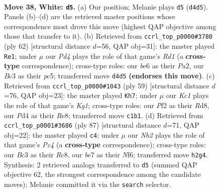 \documentclass[11pt]{article}
\begin{document}
\clearpage

\begin{figure}[p]\centering
\begin{subfigure}{0.46\textwidth}\centering
\resizebox{\linewidth}{!}{%
\newchessgame
\chessboard[
  setfen={1k5r/rp2b1p1/p1p1b2p/P4p2/R1pP3P/2B1P1P1/1P3P1N/2K4R w - - 3 38},
  showmover=false,
  pgfstyle=straightmove, color=movearrow, markmove={d4-d5}
]}
\caption{}
\end{subfigure}\hfill
\begin{subfigure}{0.46\textwidth}\centering
\resizebox{\linewidth}{!}{%
\newchessgame
\chessboard[
  setfen={5k2/2r2pb1/1r2p1p1/p1p4p/7P/1PPP2P1/P1R1BPK1/3R4 w - - 0 32},
  showmover=false,
  pgfstyle=straightmove, color=movearrow, markmove={d1-e1}
]}
\caption{}
\end{subfigure}
\\[4pt]
\begin{subfigure}{0.46\textwidth}\centering
\resizebox{\linewidth}{!}{%
\newchessgame
\chessboard[
  setfen={3rrbk1/p4p2/1p1ppP1p/7p/P1PBP3/1P6/6PP/4RRK1 b - - 1 30},
  showmover=false,
  pgfstyle=straightmove, color=movearrow, markmove={g8-h7}
]}
\caption{}
\end{subfigure}\hfill
\begin{subfigure}{0.46\textwidth}\centering
\resizebox{\linewidth}{!}{%
\newchessgame
\chessboard[
  setfen={2r3k1/5pp1/3p1n1p/pBp1p3/P3P3/1RPP3P/2r2PP1/5RK1 b - - 3 44},
  showmover=false,
  pgfstyle=straightmove, color=movearrow, markmove={c5-c4}
]}
\caption{}
\end{subfigure}
\caption{\textbf{Move 38, White: \texttt{d5}.} (a) Our position; Melanie plays \texttt{d5} (\texttt{d4d5}). Panels (b)--(d) are the retrieved master positions whose correspondence most drove this move (highest QAP objective among those that transfer to it). (b) Retrieved from \texttt{ccrl\_top\_p0000\#3780} (ply 62) [structural distance $d$=56, QAP obj=31]: the master played \texttt{Re1}; under $\mu$ our \emph{Pd4} plays the role of that game's \emph{Rd1} (a \textbf{cross-type} correspondence); cross-type roles: our \emph{b}e6 as their \emph{P}a2, our \emph{B}c3 as their \emph{p}c5; transferred move \texttt{d4d5} \textbf{(endorses this move)}. (c) Retrieved from \texttt{ccrl\_top\_p0000\#1043} (ply 59) [structural distance $d$=76, QAP obj=23]: the master played \texttt{Kh7}; under $\mu$ our \emph{Kc1} plays the role of that game's \emph{Kg1}; cross-type roles: our \emph{P}f2 as their \emph{R}d8, our \emph{P}d4 as their \emph{R}e8; transferred move \texttt{c1b1}. (d) Retrieved from \texttt{ccrl\_top\_p0001\#3686} (ply 87) [structural distance $d$=71, QAP obj=22]: the master played \texttt{c4}; under $\mu$ our \emph{Nh2} plays the role of that game's \emph{Pc4} (a \textbf{cross-type} correspondence); cross-type roles: our \emph{B}c3 as their \emph{R}c8, our \emph{b}e7 as their \emph{N}f6; transferred move \texttt{h2g4}. Synthesis: 2 retrieved analogs transferred to \texttt{d5} (summed QAP objective 62, the strongest correspondence among the candidate moves); Melanie committed it via the \texttt{search} selector.}
\label{fig:thought-m74}
\end{figure}
\end{document}
